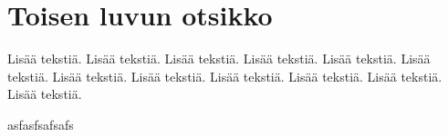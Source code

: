\chapter{Toisen luvun otsikko}
\label{Toinen luku}

Lisää tekstiä. Lisää tekstiä. Lisää tekstiä. Lisää tekstiä. Lisää tekstiä. Lisää tekstiä. Lisää tekstiä. Lisää tekstiä. Lisää tekstiä. Lisää tekstiä. Lisää tekstiä. Lisää tekstiä.

asfasfsafsafs